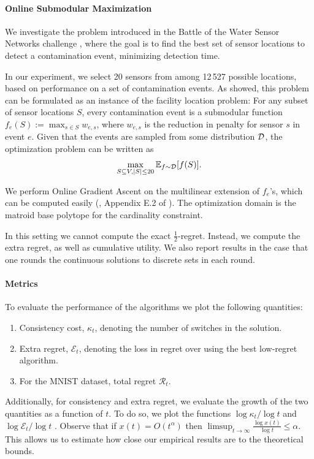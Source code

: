 \paragraph{Online Submodular Maximization}
We investigate the problem introduced in the Battle of the Water Sensor Networks challenge \cite{ostfeld08bwsn}, where the goal is to find the best set of sensor locations to detect a contamination event, minimizing detection time.

In our experiment, we select 20 sensors from among 12\,527 possible locations, based on performance on a set of contamination events.  As \cite{leskovec07cost} showed, this problem can be formulated as an instance of the facility location problem: For any subset of sensor locations $S$, every contamination event is a submodular function $f_e(S) := \max_{s\in S} w_{e,s}$, where $w_{e,s}$ is the reduction in penalty for sensor $s$ in event $e$. Given that the events are sampled from some distribution $\mathcal{D}$, the optimization problem can be written as
\[
    \max_{S\subseteq V, |S|\leq 20} \mathbb{E}_{f\sim \mathcal{D}}[f(S)].
\]

We perform Online Gradient Ascent on the multilinear extension of $f_e$'s, which can be computed easily (\cf, Appendix E.2 of \cite{Karimi2017}). The optimization domain is the matroid base polytope for the cardinality constraint.

In this setting we cannot compute the exact  $\frac{1}{2}$-regret. Instead, we compute the extra regret, as well as cumulative utility. We also report results in the case that one rounds the continuous solutions to discrete sets in each round. 

\paragraph{Metrics}
To evaluate the performance of the algorithms we plot the following quantities:
\begin{enumerate}\itemsep=0in
\item Consistency cost, $\kappa_t$, denoting the number of switches in the solution. 
\item Extra regret, $\mathcal{E}_t$, denoting the loss in regret over using the best low-regret algorithm. 
\item For the MNIST dataset, total regret $\mathcal{R}_t$.
\end{enumerate}

Additionally, for consistency and extra regret, we evaluate the growth of the two quantities as a function of $t$. To do so, we plot the functions $\log \kappa_t / \log t$ and $\log \mathcal{E}_t / \log t$ . Observe that if $x(t) = O(t^{\alpha})$ then $\limsup_{t\to\infty} \frac{\log x(t)}{\log t} \leq \alpha$. This allows us to estimate how close our empirical results are to the theoretical bounds. 

